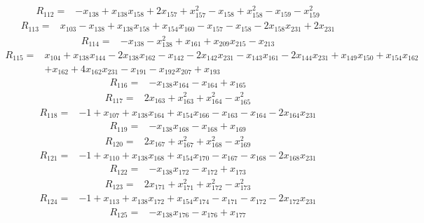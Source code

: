 \begin{align*}
 R_{112}={}&-x_{138} +x_{138}x_{158} +2x_{157} +x_{157}^{2} -x_{158} +x_{158}^{2} -x_{159} -x_{159}^{2}
\end{align*}
\begin{align*}
 R_{113}={}&x_{103} -x_{138} +x_{138}x_{158} +x_{154}x_{160} -x_{157} -x_{158} -2x_{158}x_{231} +2x_{231}
\end{align*}
\begin{align*}
 R_{114}={}&-x_{138} -x_{138}^{2} +x_{161} +x_{209}x_{215} -x_{213}
\end{align*}
\begin{align*}
 R_{115}={}&x_{104} +x_{138}x_{144} -2x_{138}x_{162} -x_{142} -2x_{142}x_{231} -x_{143}x_{161} -2x_{144}x_{231} +x_{149}x_{150} +x_{154}x_{162}\\
 &+x_{162} +4x_{162}x_{231} -x_{191} -x_{192}x_{207} +x_{193}
\end{align*}
\begin{align*}
 R_{116}={}&-x_{138}x_{164} -x_{164} +x_{165}
\end{align*}
\begin{align*}
 R_{117}={}&2x_{163} +x_{163}^{2} +x_{164}^{2} -x_{165}^{2}
\end{align*}
\begin{align*}
 R_{118}={}&-1 +x_{107} +x_{138}x_{164} +x_{154}x_{166} -x_{163} -x_{164} -2x_{164}x_{231}
\end{align*}
\begin{align*}
 R_{119}={}&-x_{138}x_{168} -x_{168} +x_{169}
\end{align*}
\begin{align*}
 R_{120}={}&2x_{167} +x_{167}^{2} +x_{168}^{2} -x_{169}^{2}
\end{align*}
\begin{align*}
 R_{121}={}&-1 +x_{110} +x_{138}x_{168} +x_{154}x_{170} -x_{167} -x_{168} -2x_{168}x_{231}
\end{align*}
\begin{align*}
 R_{122}={}&-x_{138}x_{172} -x_{172} +x_{173}
\end{align*}
\begin{align*}
 R_{123}={}&2x_{171} +x_{171}^{2} +x_{172}^{2} -x_{173}^{2}
\end{align*}
\begin{align*}
 R_{124}={}&-1 +x_{113} +x_{138}x_{172} +x_{154}x_{174} -x_{171} -x_{172} -2x_{172}x_{231}
\end{align*}
\begin{align*}
 R_{125}={}&-x_{138}x_{176} -x_{176} +x_{177}
\end{align*}
